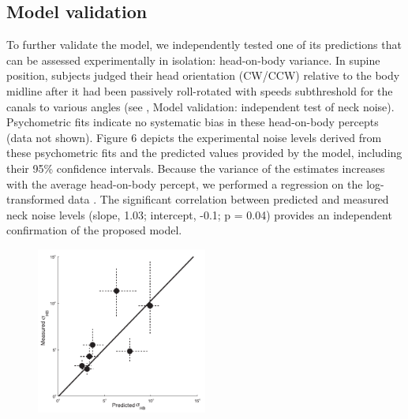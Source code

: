\subsection{Model validation}
 
To further validate the model, we independently tested one of its predictions that can be assessed experimentally in isolation: head-on-body variance. In supine position, subjects judged their head orientation (CW/CCW) relative to the body midline after it had been passively roll-rotated with speeds subthreshold for the canals to various angles (see , Model validation: independent test of neck noise). Psychometric fits indicate no systematic bias in these head-on-body percepts (data not shown). Figure 6 depicts the experimental noise levels derived from these psychometric fits and the predicted values provided by the model, including their 95\% confidence intervals. Because the variance of the estimates increases with the average head-on-body percept, we performed a regression on the log-transformed data \cite{hopkins2000}. The significant correlation between predicted and measured neck noise levels (slope, 1.03; intercept, -0.1; p = 0.04) provides an independent confirmation of the proposed model. 

\begin{figure}
    \includegraphics[width=0.5\textwidth]{src/paper1/figure6.pdf}
\end{figure}